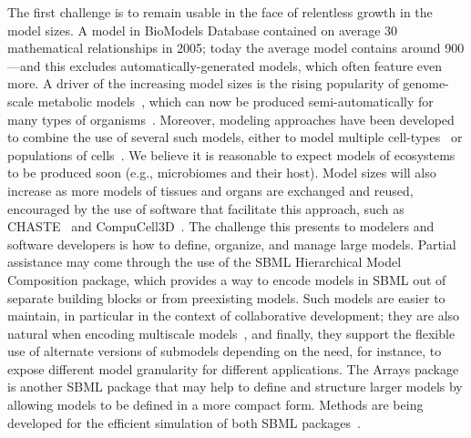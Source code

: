 \documentclass[]{draft-sbml-paper}
\begin{document}
The first challenge is to remain usable in the face of relentless growth in the model sizes.  A model in BioModels Database contained on average 30 mathematical relationships in 2005; today the average model contains around 900---and this excludes automatically-generated models, which often feature even more.  A driver of the increasing model sizes is the rising popularity of genome-scale metabolic models~\citep{Bordbar2014a}, which can now be produced semi-automatically for many types of organisms~\citep{henry2010high, buchel2013path2models, Magnusdottir2017}. Moreover, modeling approaches have been developed to combine the use of several such models, either to model multiple cell-types~\citep{bordbar2011multi} or populations of cells~\citep{damiani2017popfba}. We believe it is reasonable to expect models of ecosystems to be produced soon (e.g., microbiomes and their host). Model sizes will also increase as more models of tissues and organs are exchanged and reused, encouraged by the use of software that facilitate this approach, such as CHASTE~\citep{mirams2013chaste} and CompuCell3D~\citep{swat2012multi}.  The challenge this presents to modelers and software developers is how to define, organize, and manage large models.  Partial assistance may come through the use of the SBML Hierarchical Model Composition package, which provides a way to encode models in SBML out of separate building blocks or from preexisting models.  Such models are easier to maintain, in particular in the context of collaborative development; they are also natural when encoding multiscale models~\citep{chew2014multiscale}, and finally, they support the flexible use of alternate versions of submodels depending on the need, for instance, to expose different model granularity for different applications.  The Arrays package is another SBML package that may help to define and structure larger models by allowing models to be defined in a more compact form.  Methods are being developed for the efficient simulation of both SBML packages~\citep{watanabe2014hierarchical, watanabe2016efficient}.
\end{document}
